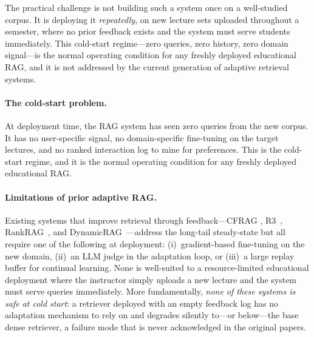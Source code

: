 \documentclass[preprint,12pt]{elsarticle}
\begin{document}
The practical challenge is not building such a system once on a well-studied
corpus.  It is deploying it \emph{repeatedly}, on new lecture sets uploaded
throughout a semester, where no prior feedback exists and the system must serve
students immediately.  This cold-start regime---zero queries, zero history,
zero domain signal---is the normal operating condition for any freshly deployed
educational RAG, and it is not addressed by the current generation of adaptive
retrieval systems.

\paragraph{The cold-start problem.}
At deployment time, the RAG system has seen zero queries from the new corpus.
It has no user-specific signal, no domain-specific fine-tuning on the target
lectures, and no ranked interaction log to mine for preferences.  This is the
cold-start regime, and it is the normal operating condition for any freshly
deployed educational RAG.

\paragraph{Limitations of prior adaptive RAG.}
Existing systems that improve retrieval through feedback---CFRAG
\citep{cfrag2025}, R3~\citep{r32025}, RankRAG~\citep{rankrag2024}, and
DynamicRAG~\citep{dynamicrag2024}---address the long-tail steady-state but all
require one of the following at deployment: (i)~gradient-based fine-tuning on
the new domain, (ii)~an LLM judge in the adaptation loop, or (iii)~a large
replay buffer for continual learning.  None is well-suited to a
resource-limited educational deployment where the instructor simply uploads a
new lecture and the system must serve queries immediately.  More fundamentally,
\emph{none of these systems is safe at cold start}: a retriever deployed with
an empty feedback log has no adaptation mechanism to rely on and degrades
silently to---or below---the base dense retriever, a failure mode that is never
acknowledged in the original papers.
\end{document}

